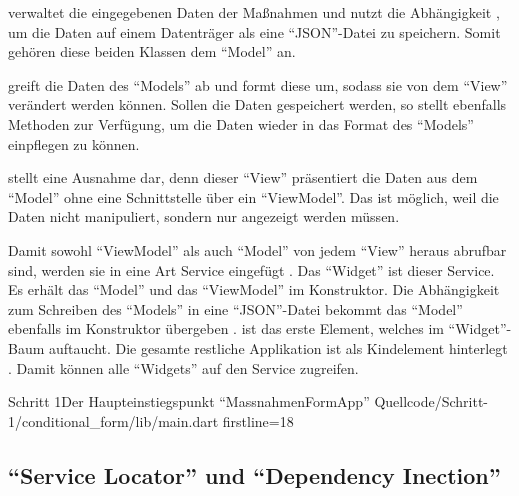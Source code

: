   verwaltet die eingegebenen Daten der Maßnahmen
und nutzt die Abhängigkeit ,
um die Daten auf einem Datenträger als eine \enquote{JSON}-Datei zu speichern.
Somit gehören diese beiden Klassen dem \enquote{Model} an.

  greift die Daten des \enquote{Models} ab und formt diese um,
sodass sie von dem \enquote{View}   verändert werden können.
Sollen die Daten gespeichert werden, so stellt  ebenfalls Methoden zur Verfügung,
um die Daten wieder in das Format des \enquote{Models} einpflegen zu können.

  stellt eine Ausnahme dar,
denn dieser \enquote{View} präsentiert die Daten aus dem \enquote{Model} ohne eine Schnittstelle über ein \enquote{ViewModel}.
Das ist möglich,
weil die Daten nicht manipuliert,
sondern nur angezeigt werden müssen.

Damit sowohl \enquote{ViewModel} als auch \enquote{Model} von jedem \enquote{View} heraus abrufbar sind,
werden sie in eine Art Service eingefügt .
Das \enquote{Widget}  ist dieser Service.
 Es erhält das \enquote{Model}  und das \enquote{ViewModel}   im Konstruktor.
Die Abhängigkeit zum Schreiben des \enquote{Models} in eine \enquote{JSON}-Datei  bekommt das \enquote{Model} ebenfalls im Konstruktor übergeben .
 ist das erste Element, welches im \enquote{Widget}-Baum auftaucht.
Die gesamte restliche Applikation ist als Kindelement hinterlegt .
Damit können alle \enquote{Widgets} auf den Service zugreifen.

\begin{alexlisting}{Schritt 1}{Der Haupteinstiegspunkt \enquote{MassnahmenFormApp}}
  {Quellcode/Schritt-1/conditional_form/lib/main.dart}
  {firstline=18}
  \label{lst:Schritt1DerHaupteinstiegspunkt}
\end{alexlisting}

\subsection{\enquote{Service Locator} und \enquote{Dependency Inection}}

